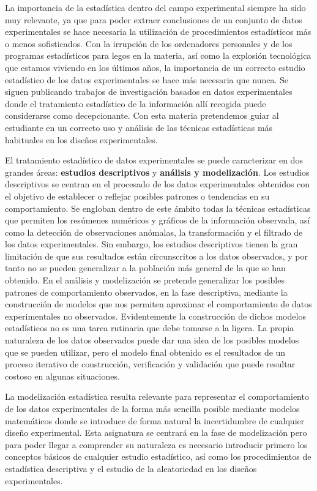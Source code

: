 \documentclass[
]{book}
\begin{document}
La importancia de la estadística dentro del campo experimental siempre ha sido muy relevante, ya que para poder extraer conclusiones de un conjunto de datos experimentales se hace necesaria la utilización de procedimientos estadísticos más o menos sofisticados. Con la irrupción de los ordenadores personales y de los programas estadísticos para legos en la materia, así como la explosión tecnológica que estamos viviendo en los últimos años, la importancia de un correcto estudio estadístico de los datos experimentales se hace más necesaria que nunca. Se siguen publicando trabajos de investigación basados en datos experimentales donde el tratamiento estadístico de la información allí recogida puede considerarse como decepcionante. Con esta materia pretendemos guiar al estudiante en un correcto uso y análisis de las técnicas estadísticas más habituales en los diseños experimentales.

El tratamiento estadístico de datos experimentales se puede caracterizar en dos grandes áreas: \textbf{estudios descriptivos} y \textbf{análisis y modelización}. Los estudios descriptivos se centran en el procesado de los datos experimentales obtenidos con el objetivo de establecer o reflejar posibles patrones o tendencias en su comportamiento. Se engloban dentro de este ámbito todas la técnicas estadísticas que permiten los resúmenes numéricos y gráficos de la información observada, así como la detección de observaciones anómalas, la transformación y el filtrado de los datos experimentales. Sin embargo, los estudios descriptivos tienen la gran limitación de que sus resultados están circunscritos a los datos observados, y por tanto no se pueden generalizar a la población más general de la que se han obtenido. En el análisis y modelización se pretende generalizar los posibles patrones de comportamiento observados, en la fase descriptiva, mediante la construcción de modelos que nos permiten aproximar el comportamiento de datos experimentales no observados. Evidentemente la construcción de dichos modelos estadísticos no es una tarea rutinaria que debe tomarse a la ligera. La propia naturaleza de los datos observados puede dar una idea de los posibles modelos que se pueden utilizar, pero el modelo final obtenido es el resultados de un proceso iterativo de construcción, verificación y validación que puede resultar costoso en algunas situaciones.

La modelización estadística resulta relevante para representar el comportamiento de los datos experimentales de la forma más sencilla posible mediante modelos matemáticos donde se introduce de forma natural la incertidumbre de cualquier diseño experimental. Esta asignatura se centrará en la fase de modelización pero para poder llegar a comprender su naturaleza es necesario introducir primero los conceptos básicos de cualquier estudio estadístico, así como los procedimientos de estadística descriptiva y el estudio de la aleatoriedad en los diseños experimentales.
\end{document}
